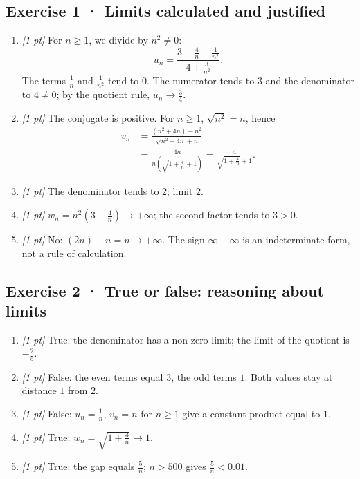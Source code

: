 \subsection*{Exercise 1 · Limits calculated and justified}\begin{enumerate}

\item \textit{[1 pt]} For $n\ge1$, we divide by $n^2\ne0$:
\[u_n=\frac{3+\frac{4}{n}-\frac{1}{n^2}}{4+\frac{3}{n^2}}.\]
The terms $\frac{1}{n}$ and $\frac{1}{n^2}$ tend to $0$. The numerator tends to $3$ and the denominator to $4\ne0$; by the quotient rule, $u_n\to\frac{3}{4}$.

\item \textit{[1 pt]} The conjugate is positive. For $n\ge1$, $\sqrt{n^2}=n$, hence
\[\begin{aligned}v_n&=\frac{(n^2+4n)-n^2}{\sqrt{n^2+4n}+n}\\&=\frac{4n}{n(\sqrt{1+\frac{4}{n}}+1)}=\frac{4}{\sqrt{1+\frac{4}{n}}+1}.\end{aligned}\]

\item \textit{[1 pt]} The denominator tends to $2$; limit $2$.

\item \textit{[1 pt]} $w_n=n^2(3-\frac{4}{n})\to+\infty$; the second factor tends to $3>0$.

\item \textit{[1 pt]} No: $(2n)-n=n\to+\infty$. The sign $\infty-\infty$ is an indeterminate form, not a rule of calculation.

\end{enumerate}

\subsection*{Exercise 2 · True or false: reasoning about limits}\begin{enumerate}

\item \textit{[1 pt]} True: the denominator has a non-zero limit; the limit of the quotient is $-\frac{2}{5}$.

\item \textit{[1 pt]} False: the even terms equal $3$, the odd terms $1$. Both values stay at distance $1$ from $2$.

\item \textit{[1 pt]} False: $u_n=\frac{1}{n}$, $v_n=n$ for $n\ge1$ give a constant product equal to $1$.

\item \textit{[1 pt]} True: $w_n=\sqrt{1+\frac{3}{n}}\to1$.

\item \textit{[1 pt]} True: the gap equals $\frac{5}{n}$; $n>500$ gives $\frac{5}{n}<0.01$.

\end{enumerate}

